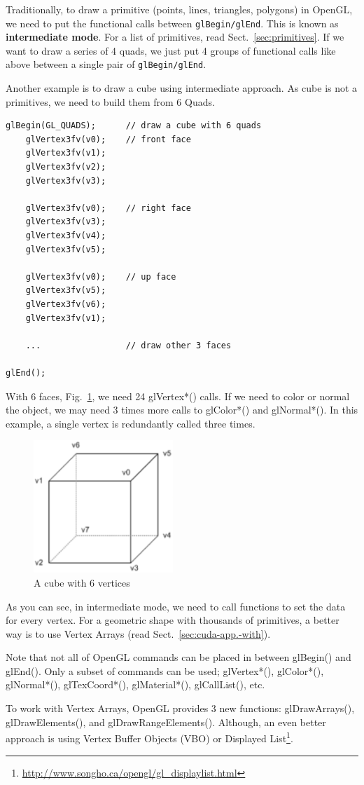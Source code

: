 Traditionally, to draw a primitive (points, lines, triangles,
polygons) in OpenGL, we need to put the functional calls between
\verb!glBegin/glEnd!. This is known as {\bf intermediate mode}. For a
list of primitives, read Sect.~\ref{sec:primitives}. If we want to
draw a series of 4 quads, we just put 4 groups of functional calls
like above between a single pair of \verb!glBegin/glEnd!. 

Another example is to draw a cube using intermediate approach. As cube
is not a primitives, we need to build them from 6 Quads.
\begin{verbatim}
glBegin(GL_QUADS);      // draw a cube with 6 quads
    glVertex3fv(v0);    // front face
    glVertex3fv(v1);
    glVertex3fv(v2);
    glVertex3fv(v3);

    glVertex3fv(v0);    // right face
    glVertex3fv(v3);
    glVertex3fv(v4);
    glVertex3fv(v5);

    glVertex3fv(v0);    // up face
    glVertex3fv(v5);
    glVertex3fv(v6);
    glVertex3fv(v1);

    ...                 // draw other 3 faces

glEnd();
\end{verbatim}
With 6 faces, Fig.~\ref{fig:cube}, we need 24 glVertex*() calls. If we
need to color or normal the object, we may need 3 times more calls to
glColor*() and glNormal*(). In this example, a single vertex is
redundantly called three times.

\begin{figure}[hbt]
  \centerline{\includegraphics[height=5cm,
    angle=0]{./images/cube.eps}}
\caption{A cube with 6 vertices}
\label{fig:cube}
\end{figure}


As you can see, in intermediate mode, we need to call functions to set
the data for every vertex. For a geometric shape with thousands of
primitives, a better way is to use Vertex Arrays (read
Sect.~\ref{sec:cuda-app.-with}). 

\begin{framed}
  Note that not all of OpenGL commands can be placed in between
  glBegin() and glEnd(). Only a subset of commands can be used;
  glVertex*(), glColor*(), glNormal*(), glTexCoord*(), glMaterial*(),
  glCallList(), etc.

  To work with Vertex Arrays, OpenGL provides 3 new functions:
  glDrawArrays(), glDrawElements(), and
  glDrawRangeElements(). Although, an even better approach is using
  Vertex Buffer Objects (VBO) or Displayed
  List\footnote{\url{http://www.songho.ca/opengl/gl_displaylist.html}}.  
\end{framed}

